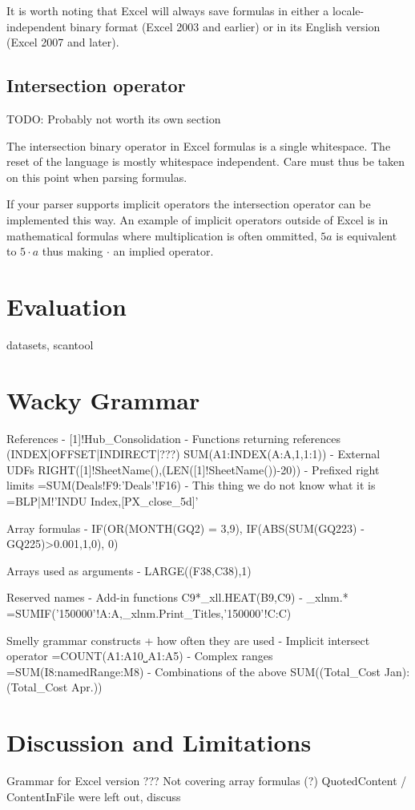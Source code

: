 \documentclass[conference]{IEEEtran}
\begin{document}
It is worth noting that Excel will always save formulas in either a locale-independent binary format (Excel 2003 and earlier) or in its English version (Excel 2007 and later).

\subsection{Intersection operator}

TODO: Probably not worth its own section

The intersection binary operator in Excel formulas is a single whitespace.
The reset of the language is mostly whitespace independent.
Care must thus be taken on this point when parsing formulas.

If your parser supports implicit operators the intersection operator can be implemented this way.
An example of implicit operators outside of Excel is in mathematical formulas where multiplication is often ommitted, $5a$ is equivalent to $5 \cdot a$ thus making $\cdot$ an implied operator.


\section{Evaluation}
datasets, scantool

\section{Wacky Grammar}

References
- [1]!Hub\_Consolidation
- Functions returning references (INDEX|OFFSET|INDIRECT|???) SUM(A1:INDEX(A:A,1,1:1))
- External UDFs RIGHT([1]!SheetName(),(LEN([1]!SheetName())-20))
- Prefixed right limits =SUM(Deals!F9:'Deals'!F16)
- This thing we do not know what it is =BLP|M!'INDU Index,[PX\_close\_5d]'

Array formulas
- IF(OR(MONTH(GQ2) = {3,9}), IF(ABS(SUM(GQ223) - GQ225)>0.001,1,0), 0)

Arrays used as arguments
- LARGE((F38,C38),1)

Reserved names
- Add-in functions C9*\_xll.HEAT(B9,C9)
- \_xlnm.* =SUMIF('150000'!A:A,\_xlnm.Print\_Titles,'150000'!C:C)

Smelly grammar constructs + how often they are used
- Implicit intersect operator =COUNT(A1:A10˽A1:A5)
- Complex ranges =SUM(I8:namedRange:M8)
- Combinations of the above SUM((Total\_Cost Jan):(Total\_Cost Apr.))

\section{Discussion and Limitations}
Grammar for Excel version ???
Not covering array formulas (?)
QuotedContent / ContentInFile were left out, discuss
\end{document}
